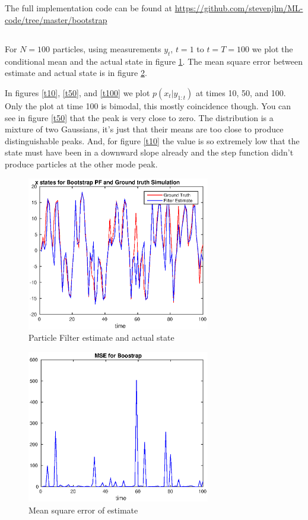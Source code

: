 \documentclass[11pt, english]{article}
\begin{document}
\subsection{}

The full implementation code can be found at \url{https://github.com/stevenjlm/ML-code/tree/master/bootstrap}

\subsection{}

For $N=100$ particles, using measurements $y_t$, $t=1$ to $t=T=100$ we plot the conditional mean and the actual state in figure \ref{bs}. The mean square error between estimate and actual state is in figure \ref{mse}.

In figures \ref{t10}, \ref{t50}, and \ref{t100} we plot $p(x_{t}|y_{1:t})$ at times 10, 50, and 100. Only the plot at time 100 is bimodal, this mostly coincidence though. You can see in figure \ref{t50} that the peak is very close to zero. The distribution is a mixture of two Gaussians, it's just that their means are too close to produce distinguishable peaks. And, for figure \ref{t10} the value is so extremely low that the state must have been in a downward slope already and the step function didn't produce particles at the other mode peak.

\begin{figure}[h]
  
  \centering
    \includegraphics[width=80mm]{./figs/003_13_gt-and-bt.eps}
    \caption{Particle Filter estimate and actual state}
    \label{bs}
\end{figure}

\begin{figure}[h]
  
  \centering
    \includegraphics[width=80mm]{./figs/004_13_mse.eps}
    \caption{Mean square error of estimate}
    \label{mse}
\end{figure}
\end{document}
